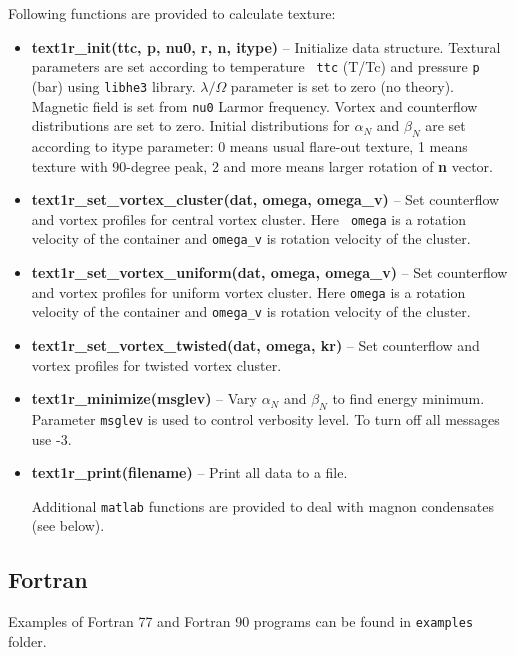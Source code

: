 \documentclass[a4paper]{article}
\begin{document}
Following functions are provided to calculate texture:
\begin{itemize}

\item {\bf text1r\_init(ttc, p, nu0, r, n, itype)} -- Initialize data
structure. Textural parameters are set according to temperature {\tt
ttc} (T/Tc) and pressure {\tt p} (bar) using {\tt libhe3} library.
$\lambda/\Omega$ parameter is set to zero (no theory). Magnetic field is
set from {\tt nu0} Larmor frequency. Vortex and counterflow
distributions are set to zero. Initial distributions for $\alpha_N$ and
$\beta_N$ are set according to itype parameter: 0 means usual flare-out
texture, 1 means texture with 90-degree peak, 2 and more means larger
rotation of {\bf n} vector.

\item {\bf text1r\_set\_vortex\_cluster(dat, omega, omega\_v)} -- Set
counterflow and vortex profiles for central vortex cluster. Here {\tt
omega} is a rotation velocity of the container and {\tt omega\_v} is
rotation velocity of the cluster.

\item {\bf text1r\_set\_vortex\_uniform(dat, omega, omega\_v)} -- Set
counterflow and vortex profiles for uniform vortex cluster. Here
{\tt omega} is a rotation velocity of the container and {\tt omega\_v}
is rotation velocity of the cluster.

\item {\bf text1r\_set\_vortex\_twisted(dat, omega, kr)} -- Set
counterflow and vortex profiles for twisted vortex cluster.

\item {\bf text1r\_minimize(msglev)} -- Vary $\alpha_N$ and $\beta_N$
to find energy minimum. Parameter {\tt msglev} is used to control verbosity
level. To turn off all messages use -3.

\item {\bf text1r\_print(filename)} -- Print all data to a file.

Additional {\tt matlab} functions are provided to deal with magnon condensates (see below).

\end{itemize}

\eject
\subsection*{Fortran}

Examples of Fortran 77 and Fortran 90 programs can be found in
{\tt examples} folder.
\end{document}
